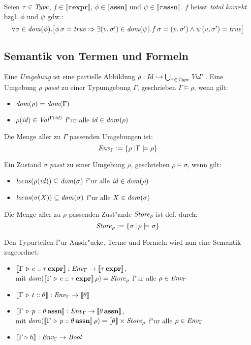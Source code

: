 \documentclass[12pt,a4paper,bigheadings]{scrartcl}
\newcommand{\semantic}[1]{\ensuremath{\llbracket#1\rrbracket}}
\newcommand{\assn}{\ensuremath{\mathbf{assn}}}
\newcommand{\atype}[1]{#1\,\assn}
\newcommand{\bexpr}{\ensuremath{\mathbf{expr}}}
\newcommand{\etype}[1]{#1\,\bexpr}
\newcommand{\locns}{\name{locns}}
\begin{document}
\begin{definition}
  Seien $\tau\in{\text{\it Type\/}}$, $f\in\semantic{\etype{\tau}}$, $\phi\in\semantic{\assn}$ und
  $\psi\in\semantic{\atype{\tau}}$. $f$ heisst {\em total korrekt} bzgl. $\phi$ und
  $\psi$ gdw.:
  \[\begin{array}{l}
    \forall \sigma\in{\text{\it dom\/}}(\phi).
    \bigl[
      \phi\,\sigma = {\text{\it true\/}} 
      \Rightarrow \exists(v,\sigma')\in{\text{\it dom\/}}(\psi).f\,\sigma = (v,\sigma')\wedge \psi\,(v,\sigma')={\text{\it true\/}}
    \bigr]
  \end{array}\]
\end{definition}

\subsection{Semantik von Termen und Formeln}

Eine {\em Umgebung} ist eine partielle Abbildung $\rho:{\text{\it Id\/}}\hookrightarrow\bigcup_{\tau\in{\text{\it Type\/}}} {\text{\it Val\/}}^\tau$.
Eine Umgebung $\rho$ {\em passt} zu einer Typumgebung $\Gamma$, geschrieben $\Gamma \models \rho$,
wenn gilt:
\begin{itemize}
  \item ${\text{\it dom\/}}(\rho) = {\text{\it dom\/}}(\Gamma)$
  \item $\rho({\text{\it id\/}}) \in {\text{\it Val\/}}^{\Gamma({\text{\it id\/}})}$ f"ur alle ${\text{\it id\/}}\in{\text{\it dom\/}}(\rho)$
\end{itemize}
Die Menge aller zu $\Gamma$ passenden Umgebungen ist:
\[
  {\text{\it Env\/}}_\Gamma := \{\rho\,|\,\Gamma \models \rho\}
\]

\noindent
Ein Zustand $\sigma$ {\em passt} zu einer Umgebung $\rho$, geschrieben $\rho \models \sigma$,
wenn gilt:
\begin{itemize}
  \item $\locns(\rho(\id)) \subseteq \dom{\sigma}$ f"ur alle ${\text{\it id\/}}\in{\text{\it dom\/}}(\rho)$
  \item $\locns(\sigma(X)) \subseteq \dom{\sigma}$ f"ur alle $X\in{\text{\it dom\/}}(\sigma)$
\end{itemize}
Die Menge aller zu $\rho$ passenden Zust"ande ${\text{\it Store\/}}_\rho$ ist def. durch:
\[
  {\text{\it Store\/}}_\rho := \{\sigma\,|\,\rho\models\sigma\}
\]

\noindent
Den Typurteilen f"ur Ausdr"ucke, Terme und Formeln wird nun eine Semantik zugeordnet:
\begin{itemize}
  \item $\semantic{\Tj{\Gamma}{e}{\etype{\tau}}}:\Env_\Gamma \to \semantic{\etype{\tau}}$, \\
        mit $\dom{\semantic{\Tj{\Gamma}{e}{\etype{\tau}}}\,\rho} = \Store_\rho$
        f"ur alle $\rho\in{\text{\it Env\/}}_\Gamma$
  \item $\semantic{\Tj{\Gamma}{t}{\theta}}:\Env_\Gamma \to \semantic{\theta}$
  \item $\semantic{\Tj{\Gamma}{p}{\atype{\theta}}}: \Env_\Gamma \to \semantic{\atype{\theta}}$, \\
        mit $\dom{\semantic{\Tj{\Gamma}{p}{\atype{\theta}}}\,\rho} = \semantic{\theta}\times\Store_\rho$
        f"ur alle $\rho\in{\text{\it Env\/}}_\Gamma$
  \item $\semantic{\Tjh{\Gamma}{h}}: \Env_\Gamma \to \Bool$
\end{itemize}
\end{document}
